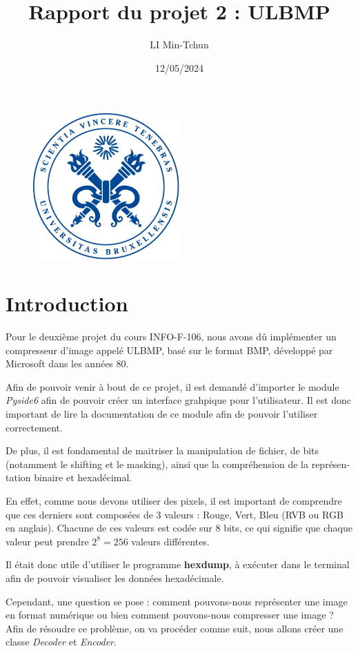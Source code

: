 \documentclass[utf8]{article}
\title{Rapport du projet 2 : ULBMP}
\author{LI Min-Tchun}
\date{12/05/2024}
\begin{document}
\maketitle
\begin{figure}[H]
\centering
\includegraphics[width=0.5\textwidth]{logo.png}
\label{fig:logo}
\end{figure}

\newpage
\tableofcontents
\newpage
\section{Introduction}
Pour le deuxième projet du cours INFO-F-106, nous avons dû implémenter un compresseur d'image appelé ULBMP, basé sur le format BMP, développé par Microsoft dans les années 80.

Afin de pouvoir venir à bout de ce projet, il est demandé d'importer le module \textit{Pyside6} afin de pouvoir créer un interface grahpique pour l'utilisateur. Il est donc important de lire la documentation de ce module afin de pouvoir l'utiliser correctement.

De plus, il est fondamental de maitriser la manipulation de fichier, de bits (notamment le shifting et le masking), ainsi que la compréhension de la représen-tation binaire et hexadécimal.

En effet, comme nous devons utiliser des pixels, il est important de comprendre que ces derniers sont composées de 3 valeurs : Rouge, Vert, Bleu (RVB ou RGB en anglais). Chacune de ces valeurs est codée sur 8 bits, ce qui signifie que chaque valeur peut prendre $2^8 = 256$ valeurs différentes.


Il était donc utile d'utiliser le programme \textbf{hexdump}, à exécuter dans le terminal afin de pouvoir visualiser les données hexadécimale.

Cependant, une question se pose : comment pouvons-nous représenter une image en format numérique ou bien comment pouvons-nous compresser une image ? Afin de résoudre ce problème, on va procéder comme suit, nous allons créer une classe \textit{Decoder} et \textit{Encoder}. 
\end{document}
